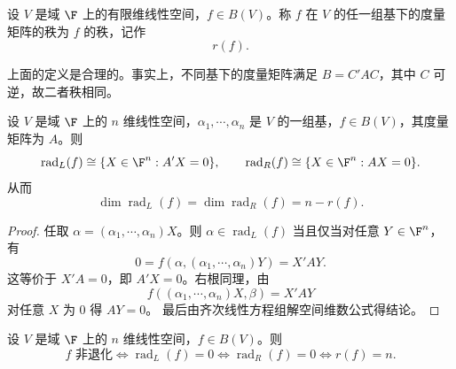 \begin{definition}[双线性型的秩]
	设 $V$ 是域 $\F$ 上的有限维线性空间，$f\in B(V)$。称 $f$ 在 $V$ 的任一组基下的度量矩阵的秩为 $f$ 的秩，记作
	\[
	r(f).
	\]
\end{definition}

上面的定义是合理的。事实上，不同基下的度量矩阵满足 $B=C'AC$，其中 $C$ 可逆，故二者秩相同。

\begin{lemma}
	设 $V$ 是域 $\F$ 上的 $n$ 维线性空间，$\alpha_1,\cdots,\alpha_n$ 是 $V$ 的一组基，$f\in B(V)$，其度量矩阵为 $A$。则
	\[
	\operatorname{rad}_L(f)\cong \{X\in\F^n:A'X=0\},
	\qquad
	\operatorname{rad}_R(f)\cong \{X\in\F^n:AX=0\}.
	\]
	从而
	\[
	\dim\operatorname{rad}_L(f)=\dim\operatorname{rad}_R(f)=n-r(f).
	\]
\end{lemma}

\begin{proof}
	任取 $\alpha=(\alpha_1,\cdots,\alpha_n)X$。则 $\alpha\in\operatorname{rad}_L(f)$ 当且仅当对任意 $Y\in\F^n$，有
	\[
	0=f(\alpha,(\alpha_1,\cdots,\alpha_n)Y)=X'AY.
	\]
	这等价于 $X'A=0$，即 $A'X=0$。右根同理，由
	\[
	f((\alpha_1,\cdots,\alpha_n)X,\beta)=X'AY
	\]
	对任意 $X$ 为 $0$ 得 $AY=0$。
	最后由齐次线性方程组解空间维数公式得结论。
\end{proof}
\begin{corollary}
	
	设 $V$ 是域 $\F$ 上的 $n$ 维线性空间，$f\in B(V)$。则
	\[
	f\text{ 非退化}
	\Longleftrightarrow
	\operatorname{rad}_L(f)=0
	\Longleftrightarrow
	\operatorname{rad}_R(f)=0
	\Longleftrightarrow
	r(f)=n.
	\]
\end{corollary}


